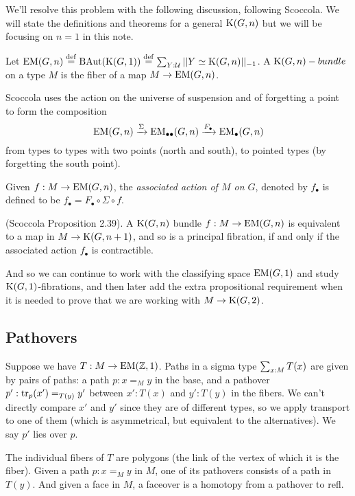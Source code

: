 We'll resolve this problem with the following discussion, following Scoccola\cite{sco}. We will state the definitions and theorems for a general \( \mathrm{K}(G,n) \) but we will be focusing on \( n=1 \) in this note.

\begin{mydef}
Let \( \mathrm{EM}(G,n)\stackrel{\mathrm{def}}{=} \mathrm{BAut}(\mathrm{K}(G,1))\stackrel{\mathrm{def}}{=} \sum_{Y:\mathcal{U}}||Y\simeq \mathrm{K}(G,n)||_{-1}\). A \( \mathrm{K}(G,n)-bundle \) on a type \( M \) is the fiber of a map \( M\to\mathrm{EM}(G,n) \).
\end{mydef}

Scoccola uses the action on the universe of suspension and of forgetting a point to form the composition 
\[ 
\mathrm{EM}(G,n)\xrightarrow[]{\Sigma} \mathrm{EM}_{\bullet\bullet}(G,n)\xrightarrow[]{F_\bullet}\mathrm{EM_{\bullet}}(G,n)
\]
from types to types with two points (north and south), to pointed types (by forgetting the south point).

\begin{mydef}
Given \( f:M\to\mathrm{EM}(G,n) \), the \emph{associated action of \( M \) on \( G \)}, denoted by \( f_\bullet \) is defined to be \( f_\bullet=F_\bullet\circ\Sigma\circ f \).
\end{mydef}

\begin{mythm}
(Scoccola\cite{sco} Proposition 2.39). A \( \mathrm{K}(G,n) \) bundle \( f:M\to\mathrm{EM}(G,n) \) is equivalent to a map in \( M\to\mathrm{K}(G,n+1) \), and so is a principal fibration, if and only if the associated action \( f_\bullet \) is contractible.
\end{mythm}

And so we can continue to work with the classifying space \( \mathrm{EM}(G,1) \) and study \( \mathrm{K}(G,1) \)-fibrations, and then later add the extra propositional requirement when it is needed to prove that we are working with \( M\to\mathrm{K}(G,2) \).

\subsection{Pathovers}
Suppose we have \( T:M\to\mathrm{EM}(\mathbb{Z},1) \). Paths in a sigma type \( \sum_{x:M}T(x) \) are given by pairs of paths: a path \( p:x=_M y \) in the base, and a pathover \( p':\mathrm{tr}_p(x')=_{T(y)}y' \) between \( x':T(x) \) and \( y':T(y) \) in the fibers. We can't directly compare \( x' \) and \( y' \) since they are of different types, so we apply transport to one of them (which is asymmetrical, but equivalent to the alternatives). We say \( p' \) lies over \( p \). 

The individual fibers of \( T \) are polygons (the link of the vertex of which it is the fiber). Given a path \( p:x=_M y \) in \( M \), one of its pathovers consists of a path in \( T(y) \). And given a face in \( M \), a faceover is a homotopy from a pathover to refl.

